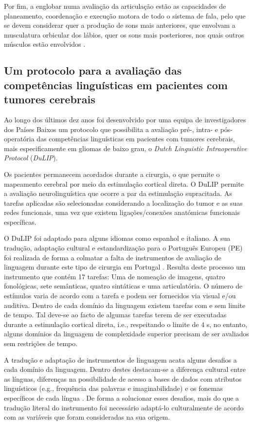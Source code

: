 \documentclass[output=paper,colorlinks,citecolor=brown,booklanguage=portuguese]{langscibook}
\begin{document}
Por fim, a englobar numa avaliação da articulação estão as capacidades de planeamento, coordenação e execução motora de todo o sistema de fala, pelo que se devem considerar quer a produção de sons mais anteriores, que envolvam a musculatura orbicular dos lábios, quer os sons mais posteriores, nos quais outros músculos estão envolvidos \citep{Devadiga2012}. 

\subsection{Um protocolo para a avaliação das competências linguísticas em pacientes com tumores cerebrais}

Ao longo dos últimos dez anos foi desenvolvido por uma equipa de investigadores dos Países Baixos \citep{Witte2015a} um protocolo que possibilita a avaliação pré-, intra- e pós-operatória das competências linguísticas em pacientes com tumores cerebrais, mais especificamente em gliomas de baixo grau, o \emph{Dutch Linguistic Intraoperative Protocol} (\emph{DuLIP}).

Os pacientes permanecem acordados durante a cirurgia, o que permite o mapeamento cerebral por meio da estimulação cortical direta. O DuLIP permite a avaliação neurolinguística que ocorre a par da estimulação supracitada. As tarefas aplicadas são selecionadas considerando a localização do tumor e as suas redes funcionais, uma vez que existem ligações/conexões anatómicas funcionais específicas.

O DuLIP foi adaptado para alguns idiomas como espanhol e italiano. A sua tradução, adaptação cultural e estandardização para o Português Europeu (PE) foi realizada de forma a colmatar a falta de instrumentos de avaliação de linguagem durante este tipo de cirurgia em Portugal \citep{Alves2021}. Resulta deste processo um instrumento que contém 17 tarefas: Uma de nomeação de imagens, quatro fonológicas, sete semânticas, quatro sintáticas e uma articulatória. O número de estímulos varia de acordo com a tarefa e podem ser fornecidos via visual e/ou auditiva. Dentro de cada domínio da linguagem existem tarefas com e sem limite de tempo. Tal deve-se ao facto de algumas tarefas terem de ser executadas durante a estimulação cortical direta, i.e., respeitando o limite de 4 s, no entanto, alguns domínios da linguagem de complexidade superior precisam de ser avaliados sem restrições de tempo.

A tradução e adaptação de instrumentos de linguagem acata alguns desafios a cada domínio da linguagem. Dentro destes destacam-se a diferença cultural entre as línguas, diferenças na possibilidade de acesso a bases de dados com atributos linguísticos (e.g., frequência das palavras e imaginabilidade) e os fonemas específicos de cada língua \citep{Fyndanis2017}. De forma a solucionar esses desafios, mais do que a tradução literal do instrumento foi necessário adaptá-lo culturalmente de acordo com as variáveis que foram consideradas na sua origem.
\end{document}

